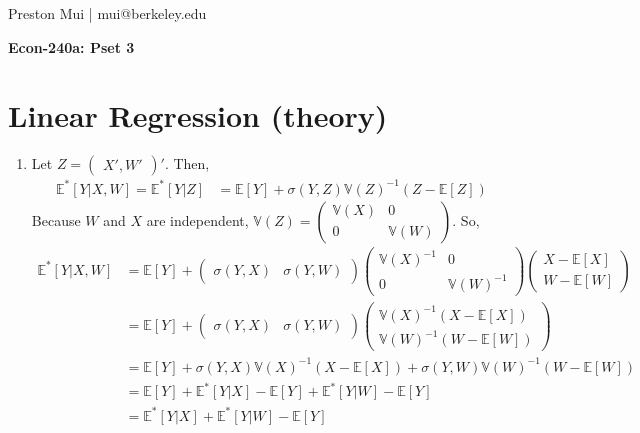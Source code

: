 \documentclass{article}[12pt]
\begin{document}
\begin{center}
	Preston Mui | mui@berkeley.edu

	{\bf Econ-240a: Pset 3}
\end{center}


\setcounter{section}{1}
\section{Linear Regression (theory)}
\begin{enumerate}

    \item Let $Z = \begin{pmatrix} X', W' \end{pmatrix}'$. Then, 
    \begin{align*}
        \mathbb{E}^*[Y | X, W] = \mathbb{E}^*[Y|Z] &= \mathbb{E}[Y] + \sigma(Y,Z) \mathbb{V}(Z)^{-1} (Z - \mathbb{E}[Z])
    \end{align*}
    Because $W$ and $X$ are independent, $\mathbb{V}(Z) = \begin{pmatrix} \mathbb{V}(X) & 0 \\ 0 & \mathbb{V}(W) \end{pmatrix}$. So, 
    \begin{align*}
        \mathbb{E}^*[Y | X, W] &= \mathbb{E}[Y] +
            \begin{pmatrix} \sigma(Y,X) & \sigma(Y,W) \end{pmatrix}
            \begin{pmatrix} \mathbb{V}(X)^{-1} & 0 \\ 0 & \mathbb{V}(W)^{-1} \end{pmatrix}
            \begin{pmatrix} X - \mathbb{E}[X] \\ W - \mathbb{E}[W] \end{pmatrix} \\
        &=  \mathbb{E}[Y] + \begin{pmatrix} \sigma(Y,X) & \sigma(Y,W) \end{pmatrix}
            \begin{pmatrix} \mathbb{V}(X)^{-1} (X - \mathbb{E}[X]) \\ \mathbb{V}(W)^{-1} (W - \mathbb{E}[W]) \end{pmatrix} \\
        &=  \mathbb{E}[Y] + \sigma(Y,X) \mathbb{V}(X)^{-1}(X - \mathbb{E}[X]) + \sigma(Y,W) \mathbb{V}(W)^{-1} (W - \mathbb{E}[W])\\
        &= \mathbb{E}[Y] + \mathbb{E}^*[Y|X] - \mathbb{E}[Y] + \mathbb{E}^*[Y|W] - \mathbb{E}[Y] \\
        &= \mathbb{E}^*[Y|X] + \mathbb{E}^*[Y|W] - \mathbb{E}[Y]
    \end{align*}


\end{enumerate}
\end{document}
